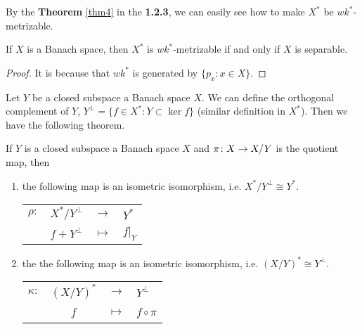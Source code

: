\documentclass[a4paper,11pt]{report}
\begin{document}
By the \textbf{Theorem} \ref{thm4} in the \textbf{1.2.3}, we can easily see how to make $X^{*}$ be $wk^{*}$-metrizable.

\begin{thm}
	If $X$ is a Banach space, then $X^{*}$ is $wk^{*}$-metrizable if and only if $X$ is separable.
\end{thm}
\begin{proof}
	It is because that $wk^{*}$ is generated by $\{p_x \colon x \in X\}$.
\end{proof}

Let $Y$ be a closed subspace a Banach space $X$. We can define the orthogonal complement of $Y$, $Y^{\bot} = \{f \in X^{*} \colon Y \subset \ker{f}\}$ (similar definition in $X^{*}$). Then we have the following theorem.

\begin{thm}
	If $Y$ is a closed subspace a Banach space $X$ and $\pi \colon X \rightarrow X/Y$ is the quotient map, then
	\begin{enumerate}[label=\arabic*)]
		\item the following map is an isometric isomorphism, i.e. $X^{*}/Y^{\bot} \cong Y^{*}$.
			\begin{center}
				\begin{tabular}{l r c l}
					$\rho \colon$ & $X^{*}/Y^{\bot}$ & $\longrightarrow$ & $Y^{*}$ \\
					~ & $f+Y^{\bot}$ & $\longmapsto$ & $f|_Y$
				\end{tabular}
			\end{center}
		\item the the following map is an isometric isomorphism, i.e. $(X/Y)^{*} \cong Y^{\bot}$.
			\begin{center}
				\begin{tabular}{l c c l}
					$\kappa \colon$ & $(X/Y)^{*}$ & $\longrightarrow$ & $Y^{\bot}$ \\
					~ & $f$ & $\longmapsto$ & $f \circ \pi$
				\end{tabular}
			\end{center}
	\end{enumerate}
\end{thm}
\end{document}
